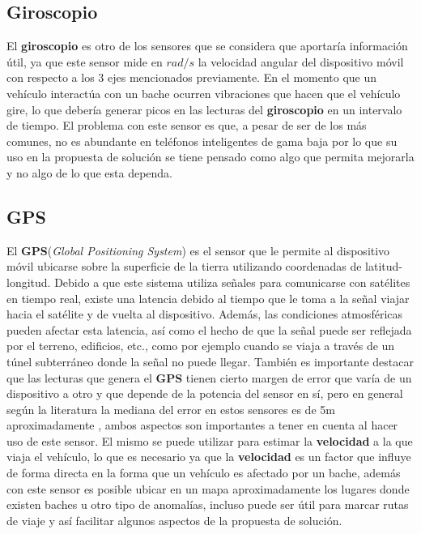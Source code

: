 	\subsection{Giroscopio}
		El \textbf{giroscopio} es otro de los sensores que se considera que aportaría información útil, ya que este sensor 
		mide en $rad/s$ la velocidad angular del dispositivo móvil con respecto a los 3 ejes mencionados previamente. 
		En el momento que un vehículo interactúa con un bache ocurren vibraciones que hacen que el vehículo gire, lo que
		debería generar picos en las lecturas del \textbf{giroscopio} en un intervalo de tiempo. El problema con este sensor es 
		que, a pesar de ser de los más comunes, no es abundante en teléfonos inteligentes de gama baja por lo que 
		su uso en la propuesta de solución se tiene pensado como algo que permita mejorarla y no algo de lo que esta
		dependa.\\

	\subsection{GPS}
		El \textbf{GPS}(\emph{Global Positioning System}) es el sensor que le permite al dispositivo móvil ubicarse sobre la
		superficie de la tierra utilizando coordenadas de latitud-longitud. Debido a que este sistema utiliza señales para
		comunicarse con satélites en tiempo real, existe una latencia debido al tiempo que le toma a la señal viajar hacia el
		satélite y de vuelta al dispositivo. Además, las condiciones atmosféricas pueden afectar esta latencia, así como el hecho
		de que la señal puede ser reflejada por el terreno, edificios, etc., como por ejemplo cuando se viaja a través de un
		túnel subterráneo donde la señal no puede llegar. También es importante destacar que las lecturas que genera el \textbf
		{GPS} tienen cierto margen de error que varía de un dispositivo a otro y que depende de la potencia del sensor en sí,
		pero en general según la literatura la mediana del error en estos sensores es de 5m aproximadamente \parencite{eriksson2008pothole},
		ambos aspectos son importantes a tener en cuenta al hacer uso de este sensor. El mismo se puede utilizar para estimar la
		\textbf{velocidad} a la que viaja el vehículo, lo que es necesario ya que la \textbf{velocidad} es un factor que influye de
		forma directa en la forma que un vehículo es afectado por un bache, además con este sensor es posible ubicar en un mapa
		aproximadamente los lugares donde existen baches u otro tipo de anomalías, incluso puede ser útil para marcar rutas de viaje
		y así facilitar algunos aspectos de la propuesta de solución.

